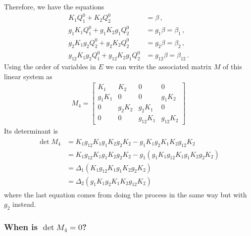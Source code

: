 Therefore, we have the equations
\begin{align}
	 K_1 Q_1^0 +  K_2 Q_2^0 &= \beta\,,\\
	 g_1K_1 Q_1^0 + g_1K_2 g_1Q_2^0 &= g_1\beta = \beta_1\,,\\
	 g_2K_1 g_2Q_2^0 + g_2K_2 Q_2^0 &= g_2\beta = \beta_2\,,\\
	 g_{12}K_1 g_2Q_1^0 + g_{12}K_2 g_1Q_2^0 &= g_{12}\beta = \beta_{12}\,.
\end{align}
Using the order of variables in $E$ we can write the associated matrix $M$ of this linear system as
\begin{align}
	M_4 = \begin{bmatrix}
	K_1 & K_2 & 0 & 0 \\
	g_1 K_1 & 0 & 0 & g_1 K_2\\
	0 & g_2 K_2 & g_2 K_1 & 0\\
	0 & 0 & g_{12}K_1 & g_{12} K_2
	\end{bmatrix}
\end{align}
Its determinant is
\begin{align}\begin{split}
	\det M_4 &= K_1 g_{12}K_1 g_1K_2g_2K_2 -g_1K_1g_2K_1K_2g_{12}K_2\\
	& = K_1 g_{12}K_1 g_1K_2g_2K_2  -g_1(g_1K_1g_{12}K_1g_1K_2g_{2}K_2)\\
	&=\Delta_1  (K_1 g_{12}K_1 g_1K_2g_2K_2)\\
	&=\Delta_2 (g_1 K_1 g_2 K_1K_2 g_{12} K_2 )
\end{split}\end{align}
where the last equation comes from doing the process in the same way but with $g_2$ instead.

\subsubsection{When is $\det M_4 = 0$?}

